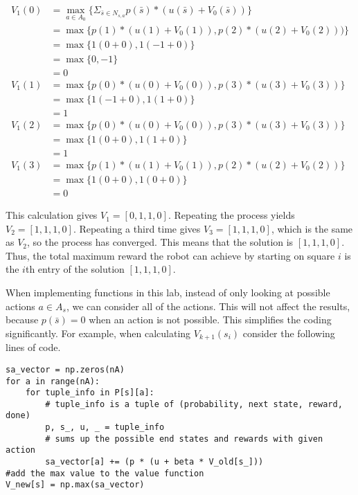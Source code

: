 \begin{align*}
V_1(0) &= \max_{a \in A_0} \{\Sigma_{\bar{s}\in N_{s,a}}p(\bar{s})*(u(\bar{s})+V_0(\bar{s}))\} \\
&= \max \{p(1)*(u(1)+V_0(1)), p(2)*(u(2)+V_0(2)))\} \\
&= \max \{1(0+0), 1(-1+0)\} \\
&= \max \{0,-1\} \\
&= 0 \\
V_1(1) &= \max \{p(0)*(u(0)+V_0(0)), p(3)*(u(3)+V_0(3))\} \\
&=\max \{1(-1+0), 1(1+0)\} \\
&= 1 \\
V_1(2) &= \max\{p(0)*(u(0)+V_0(0)), p(3)*(u(3)+V_0(3))\} \\
&=\max \{1(0+0),1(1+0)\} \\
&= 1 \\
V_1(3) &= \max\{p(1)*(u(1)+V_0(1)), p(2)*(u(2)+V_0(2))\} \\
&=\max \{1(0+0),1(0+0)\} \\
&= 0
\end{align*}

This calculation gives $V_1 = [0, 1, 1, 0]$.
Repeating the process yields $V_2 = [1, 1, 1, 0]$. Repeating a third time gives $V_3 = [1, 1, 1, 0]$, which is the same as $V_2$, so the process has converged. This means that the solution is $[1, 1, 1, 0]$.
Thus, the total maximum reward the robot can achieve by starting on square $i$ is the $i$th entry of the solution $[1, 1, 1, 0]$.

When implementing functions in this lab, instead of only looking at possible actions $a\in A_s$, we can consider all of the actions.
This will not affect the results, because $p(\bar{s}) = 0$ when an action is not possible.
This simplifies the coding significantly.
For example, when calculating $V_{k+1}(s_i)$ consider the following lines of code.

\begin{lstlisting}
sa_vector = np.zeros(nA)
for a in range(nA):
    for tuple_info in P[s][a]:
        # tuple_info is a tuple of (probability, next state, reward, done)
        p, s_, u, _ = tuple_info
        # sums up the possible end states and rewards with given action
        sa_vector[a] += (p * (u + beta * V_old[s_]))
#add the max value to the value function
V_new[s] = np.max(sa_vector)
\end{lstlisting}


